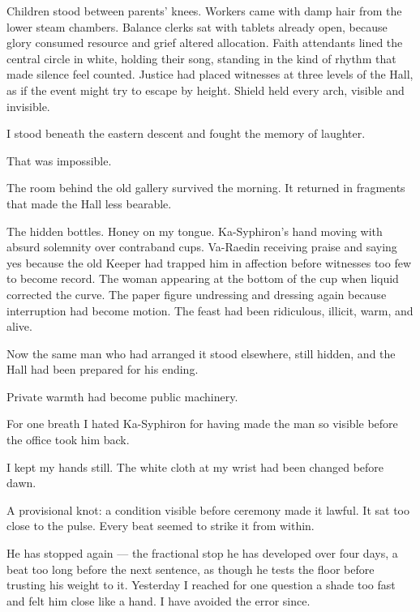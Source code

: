 Children stood between parents' knees.
Workers came with damp hair from the lower steam chambers.
Balance clerks sat with tablets already open, because glory consumed resource and grief altered allocation.
Faith attendants lined the central circle in white, holding their song, standing in the kind of rhythm that made silence feel counted.
Justice had placed witnesses at three levels of the Hall, as if the event might try to escape by height.
Shield held every arch, visible and invisible.\par
I stood beneath the eastern descent and fought the memory of laughter.\par
That was impossible.\par
The room behind the old gallery survived the morning.
It returned in fragments that made the Hall less bearable.\par
The hidden bottles.
Honey on my tongue.
Ka-Syphiron's hand moving with absurd solemnity over contraband cups.
Va-Raedin receiving praise and saying yes because the old Keeper had trapped him in affection before witnesses too few to become record.
The woman appearing at the bottom of the cup when liquid corrected the curve.
The paper figure undressing and dressing again because interruption had become motion.
The feast had been ridiculous, illicit, warm, and alive.\par
Now the same man who had arranged it stood elsewhere, still hidden, and the Hall had been prepared for his ending.\par
Private warmth had become public machinery.\par
For one breath I hated Ka-Syphiron for having made the man so visible before the office took him back.\par
I kept my hands still.
The white cloth at my wrist had been changed before dawn.\par
A provisional knot: a condition visible before ceremony made it lawful.
It sat too close to the pulse.
Every beat seemed to strike it from within.\par

\ornament

He has stopped again --- the fractional stop he has developed over four days, a beat too long before the next sentence, as though he tests the floor before trusting his weight to it. Yesterday I reached for one question a shade too fast and felt him close like a hand. I have avoided the error since.\par

